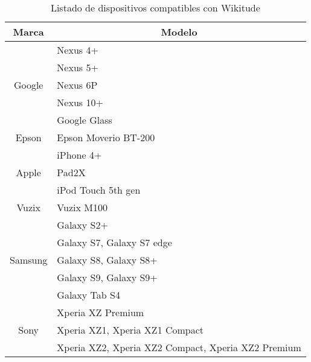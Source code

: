 \begin{table}[]
	\begin{tabular}{|c|l|}
		\hline
		\textbf{Marca}              & \multicolumn{1}{c|}{\textbf{Modelo}}               \\ \hline
		\multirow{5}{*}{Google}     & Nexus 4+                                \\ \cline{2-2} 														  
		& Nexus 5+                                           	\\ \cline{2-2} 
		& Nexus 6P                                           	\\ \cline{2-2} 
		& Nexus 10+                                          	\\ \cline{2-2} 
    	& Google Glass                                       	\\ \hline
		\multirow{1}{*}{Epson} & Epson Moverio BT-200           \\ \cline{2-2} 
		\hline
		\multirow{3}{*}{Apple}     & iPhone 4+                                \\  \cline{2-2}     														
	    & Pad2X			                                    	\\ \cline{2-2} 
		& iPod Touch 5th gen                                 	\\ \hline
		\multirow{1}{*}{Vuzix}         & Vuzix M100          	\\ \cline{2-2}
		\hline																      
		\multirow{5}{*}{Samsung} 	   & Galaxy S2+           	\\ \cline{2-2} 
		& Galaxy S7, Galaxy S7 edge                          	\\ \cline{2-2} 
		& Galaxy S8, Galaxy S8+                              	\\ \cline{2-2} 
		& Galaxy S9, Galaxy S9+                              	\\ \cline{2-2} 
		& Galaxy Tab S4                                      	\\ \hline
		\multirow{3}{*}{Sony}       & Xperia XZ Premium                                  \\ \cline{2-2} 
		& Xperia XZ1, Xperia XZ1 Compact                     \\ \cline{2-2} 
		& Xperia XZ2, Xperia XZ2 Compact, Xperia XZ2 Premium \\ \hline
	\end{tabular}
	\captionsetup{justification=centering}
	\caption{Listado de dispositivos compatibles con Wikitude}
\end{table}

